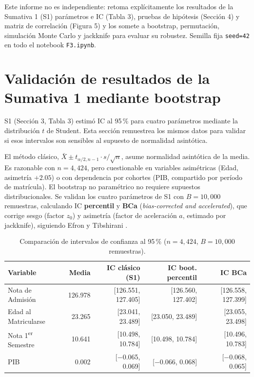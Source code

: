 \documentclass[11pt,a4paper]{article}
\begin{document}
\begin{conexionbox}
Este informe no es independiente: retoma explícitamente los resultados de la Sumativa 1
(S1) parámetros e IC (Tabla 3), pruebas de hipótesis (Sección 4) y matriz de correlación
(Figura 5)  y los somete a bootstrap, permutación, simulación Monte Carlo y jackknife para
evaluar su robustez. Semilla fija \texttt{seed=42} en todo el notebook \texttt{F3.ipynb}.
\end{conexionbox}

\vspace{0.3em}
\tableofcontents
\newpage
\section{Validación de resultados de la Sumativa 1 mediante bootstrap}

\begin{conexionbox}
S1 (Sección 3, Tabla 3) estimó IC al 95\,\% para cuatro parámetros mediante la distribución
$t$ de Student. Esta sección remuestrea los mismos datos para validar si esos intervalos son
sensibles al supuesto de normalidad asintótica.
\end{conexionbox}

El método clásico, $\bar{X}\pm t_{\alpha/2,n-1}\cdot s/\sqrt{n}$, asume normalidad asintótica
de la media. Es razonable con $n=4{,}424$, pero cuestionable en variables asimétricas (Edad,
asimetría $+2.05$) o con dependencia por cohortes (PIB, compartido por período de matrícula).
El bootstrap no paramétrico no requiere supuestos distribucionales. Se validan los cuatro
parámetros de S1 con $B=10{,}000$ remuestras, calculando IC \textbf{percentil} y \textbf{BCa}
(\textit{bias-corrected and accelerated}), que corrige sesgo (factor $z_0$) y asimetría
(factor de aceleración $a$, estimado por jackknife), siguiendo Efron y Tibshirani
\cite{efron1993}.

\begin{table}[h!]
\centering
\small
\begin{tabular}{lrrrr}
\toprule
\textbf{Variable} & \textbf{Media} & \textbf{IC clásico (S1)} & \textbf{IC boot. percentil} & \textbf{IC BCa} \\
\midrule
Nota de Admisión        & 126.978 & [126.551, 127.405] & [126.560, 127.402] & [126.558, 127.399] \\
Edad al Matricularse    &  23.265 & [23.041, 23.489]   & [23.050, 23.489]   & [23.055, 23.498] \\
Nota 1\textsuperscript{er} Semestre & 10.641 & [10.498, 10.784] & [10.498, 10.784] & [10.496, 10.783] \\
PIB                     &   0.002 & [$-$0.065, 0.069]  & [$-$0.066, 0.068]  & [$-$0.068, 0.065] \\
\bottomrule
\end{tabular}
\caption{Comparación de intervalos de confianza al 95\,\% ($n=4{,}424$, $B=10{,}000$ remuestras).}
\label{tab:boot_ci}
\end{table}
\end{document}
